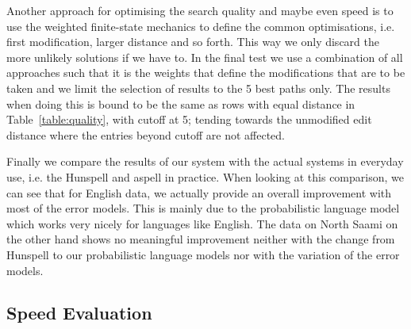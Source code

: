 \documentclass[a4paper,12pt]{article}
\begin{document}
Another approach for optimising the search quality and maybe even speed is to
use the weighted finite-state mechanics to define the common optimisations,
i.e. first modification, larger distance and so forth. This way we only discard
the more unlikely solutions if we have to. In the final test we use a
combination of all approaches such that it is the weights that define the
modifications that are to be taken and we limit the selection of results to the
5 best paths only. The results when doing this is bound to be the same as rows
with equal distance in Table~\ref{table:quality}, with cutoff at 5; tending
towards the unmodified edit distance where the entries beyond cutoff are not
affected.

%

Finally we compare the results of our system with the actual systems in
everyday use, i.e. the Hunspell and aspell in practice. When looking at this
comparison, we can see that for English data, we actually provide an overall
improvement with most of the error models.  This is mainly due to the
probabilistic language model which works very nicely for languages like
English. The data on North Saami on the other hand shows no meaningful
improvement neither with the change from Hunspell to our probabilistic language
models nor with the variation of the error models.

%


\subsection{Speed Evaluation}
\end{document}
